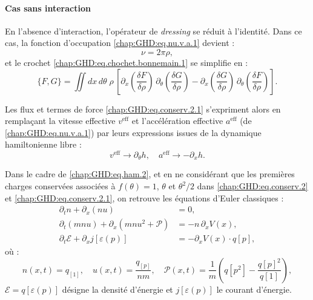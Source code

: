 \paragraph{Cas sans interaction}

En l’absence d’interaction, l’opérateur de \emph{dressing} se réduit à l’identité.  
Dans ce cas, la fonction d’occupation \eqref{chap:GHD:eq.nu.v.a.1} devient :
\begin{equation}
	\nu = 2\pi \rho,
\end{equation}
et le crochet \eqref{chap:GHD:eq.chochet.bonnemain.1} se simplifie en :
\begin{equation}
	\{F,G\} = \iint dx\,d\theta\;\rho \,\left[\partial_x \!\left( \frac{\delta F}{\delta \rho} \right)\, \partial_\theta \!\left( \frac{\delta G}{\delta \rho} \right) - \partial_x \!\left( \frac{\delta G}{\delta \rho} \right) \, \partial_\theta \!\left( \frac{\delta F}{\delta \rho} \right) \right].
\end{equation}

Les flux et termes de force \eqref{chap:GHD:eq.conserv.2.1} s’expriment alors en remplaçant la vitesse effective $v^{\mathrm{eff}}$ et l’accélération effective $a^{\mathrm{eff}}$ (de \eqref{chap:GHD:eq.nu.v.a.1}) par leurs expressions issues de la dynamique hamiltonienne libre :
\begin{equation}
	v^{\mathrm{eff}} \to \partial_\theta h, 
	\quad a^{\mathrm{eff}} \to  -\partial_x h.
\end{equation}

Dans le cadre de \eqref{chap:GHD:eq.ham.2}, et en ne considérant que les premières charges conservées associées à $f(\theta) = 1$, $\theta$ et $\theta^2/2$ dans \eqref{chap:GHD:eq.conserv.2} et \eqref{chap:GHD:eq.conserv.2.1}, on retrouve les équations d’Euler classiques :
\begin{align*}
	\partial_t n + \partial_x (n u) &= 0, \\
	\partial_t (m n u) + \partial_x (m n u^2 + \mathcal{P}) &= -n \, \partial_x V(x), \\
	\partial_t \mathcal{E} + \partial_x j[\varepsilon(p)] &= -\partial_x V(x) \cdot q[p],
\end{align*}
où :
\[
	n(x, t) = q_{[1]}, \quad
	u(x, t) = \frac{q_{[p]}}{n m}, \quad
	\mathcal{P}(x, t) = \frac{1}{m} \left( q[p^2] - \frac{q[p]^2}{q[1]} \right),
\]
$\mathcal{E} = q[\varepsilon(p)]$ désigne la densité d’énergie et $j[\varepsilon(p)]$ le courant d’énergie.


